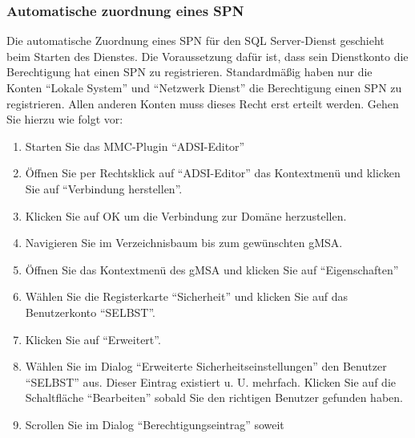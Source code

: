         \subsubsection{Automatische zuordnung eines SPN}
          Die automatische Zuordnung eines SPN für den SQL Server-Dienst geschieht
          beim Starten des Dienstes. Die Voraussetzung dafür ist, dass sein
          Dienstkonto die Berechtigung hat einen SPN zu registrieren.
          Standardmäßig haben nur die Konten \enquote{Lokale System} und
          \enquote{Netzwerk Dienst} die Berechtigung einen SPN zu registrieren.
          Allen anderen Konten muss dieses Recht erst erteilt werden. Gehen Sie
          hierzu wie folgt vor:
          \begin{enumerate}
            \item Starten Sie das MMC-Plugin \enquote{ADSI-Editor}
            \item Öffnen Sie per Rechtsklick auf \enquote{ADSI-Editor} das
            Kontextmenü und klicken Sie auf \enquote{Verbindung herstellen}.
            \item Klicken Sie auf OK um die Verbindung zur Domäne herzustellen.
            \item Navigieren Sie im Verzeichnisbaum bis zum gewünschten gMSA.
            \item Öffnen Sie das Kontextmenü des gMSA und klicken Sie auf
            \enquote{Eigenschaften}
\clearpage
            \item Wählen Sie die Registerkarte \enquote{Sicherheit} und klicken
            Sie auf das Benutzerkonto \enquote{SELBST}.
            \item Klicken Sie auf \enquote{Erweitert}.
            \item Wählen Sie im Dialog \enquote{Erweiterte
            Sicherheitseinstellungen} den Benutzer \enquote{SELBST} aus. Dieser
            Eintrag existiert u. U. mehrfach. Klicken Sie auf die Schaltfläche
            \enquote{Bearbeiten} sobald Sie den richtigen Benutzer gefunden
            haben.
            \item Scrollen Sie im Dialog \enquote{Berechtigungseintrag} soweit

\end{enumerate}
